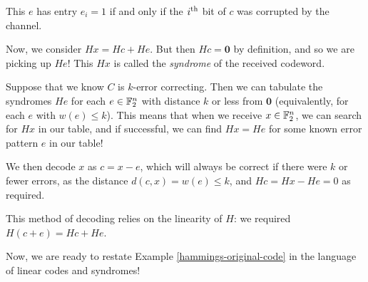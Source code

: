 \documentclass{article}
\begin{document}
\begin{note}
	This $e$ has entry $e_i = 1$ if and only if the $i^{\text{th}}$ bit of $c$ was corrupted by the channel.
\end{note}

Now, we consider $Hx = Hc + He$.
But then $Hc = \mathbf{0}$ by definition, and so we are picking up $He$!
This $Hx$ is called the \textit{syndrome} of the received codeword.

Suppose that we know $C$ is $k$-error correcting.
Then we can tabulate the syndromes $He$ for each $e \in \mathbb{F}_2^n$ with distance $k$ or less from $\mathbf{0}$ (equivalently, for each $e$ with $w(e) \leq k$).
This means that when we receive $x \in \mathbb{F}_2^n$, we can search for $Hx$ in our table, and if successful, we can find $Hx = He$ for some known error pattern $e$ in our table!

We then decode $x$ as $c = x - e$, which will always be correct if there were $k$ or fewer errors, as the distance $d(c, x) = w(e) \leq k$, and $Hc = Hx - He = 0$ as required.

\begin{note}
	This method of decoding relies on the linearity of $H$: we required $H(c + e) = Hc + He$.
\end{note}

Now, we are ready to restate Example \ref{hammings-original-code} in the language of linear codes and syndromes!
\end{document}
